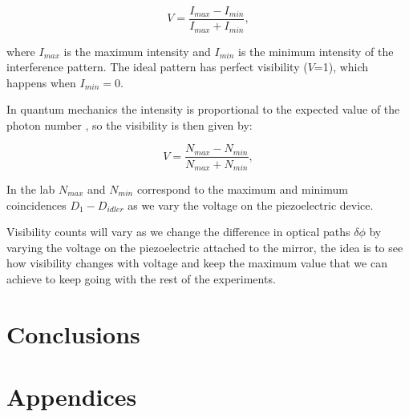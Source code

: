 \documentclass{book}
\begin{document}
\begin{equation}
V=\frac{I_{max}-I_{min}}{I_{max}+I_{min}},
\end{equation}

where $I_{max}$ is the maximum intensity and $I_{min}$ is the minimum intensity of the interference pattern. The ideal pattern has perfect visibility ($V$=1), which happens when $I_{min}=0$.

In quantum mechanics the intensity is proportional to the expected value of the photon number \cite {glauber}, so the visibility is then given by:

\begin{equation}
V=\frac{N_{max}-N_{min}}{N_{max}+N_{min}},
\end{equation}

In the lab $N_{max}$ and $N_{min}$ correspond to the maximum and minimum coincidences $D_{1}-D_{idler}$ as we vary the voltage on the piezoelectric device.

Visibility counts will vary as we change the difference in optical paths $\delta\phi$ by varying the voltage on the piezoelectric attached to the mirror, the idea is to see how visibility changes with voltage and keep the maximum value that we can achieve to keep going with the rest of the experiments.
  
\pagebreak






\pagebreak 
\chapter{Conclusions}
\pagebreak


\chapter{Appendices}
\pagebreak





\vspace{1 cm}
\end{document}
